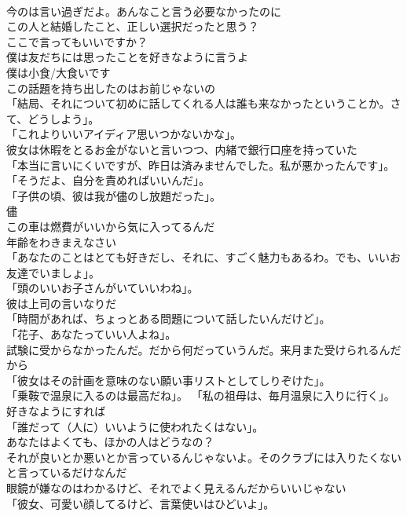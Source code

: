 \documentclass[8pt]{extreport}
\begin{document}
\begin{CJK}{UTF8}{min}
\\	今のは言い過ぎだよ。あんなこと言う必要なかったのに	
\\	この人と結婚したこと、正しい選択だったと思う？	
\\	ここで言ってもいいですか？	
\\	僕は友だちには思ったことを好きなように言うよ	
\\	僕は小食/大食いです	
\\	この話題を持ち出したのはお前じゃないの	
\\	「結局、それについて初めに話してくれる人は誰も来なかったということか。さて、どうしよう」。	
\\	「これよりいいアイディア思いつかないかな」。	
\\	彼女は休暇をとるお金がないと言いつつ、内緒で銀行口座を持っていた	
\\	「本当に言いにくいですが、昨日は済みませんでした。私が悪かったんです」。	
\\	「そうだよ、自分を責めればいいんだ」。	
\\	「子供の頃、彼は我が儘のし放題だった」。	
\\	儘
\\	この車は燃費がいいから気に入ってるんだ	
\\	年齢をわきまえなさい	
\\	「あなたのことはとても好きだし、それに、すごく魅力もあるわ。でも、いいお友達でいましょ」。	
\\	「頭のいいお子さんがいていいわね」。	
\\	彼は上司の言いなりだ	
\\	「時間があれば、ちょっとある問題について話したいんだけど」。	
\\	「花子、あなたっていい人よね」。	
\\	試験に受からなかったんだ。だから何だっていうんだ。来月また受けられるんだから	
\\	「彼女はその計画を意味のない願い事リストとしてしりぞけた」。	
\\	「乗鞍で温泉に入るのは最高だね」。 「私の祖母は、毎月温泉に入りに行く」。	
\\	好きなようにすれば	
\\	「誰だって（人に）いいように使われたくはない」。	
\\	あなたはよくても、ほかの人はどうなの？	
\\	それが良いとか悪いとか言っているんじゃないよ。そのクラブには入りたくないと言っているだけなんだ	
\\	眼鏡が嫌なのはわかるけど、それでよく見えるんだからいいじゃない	
\\	「彼女、可愛い顔してるけど、言葉使いはひどいよ」。	

\end{CJK}
\end{document}
